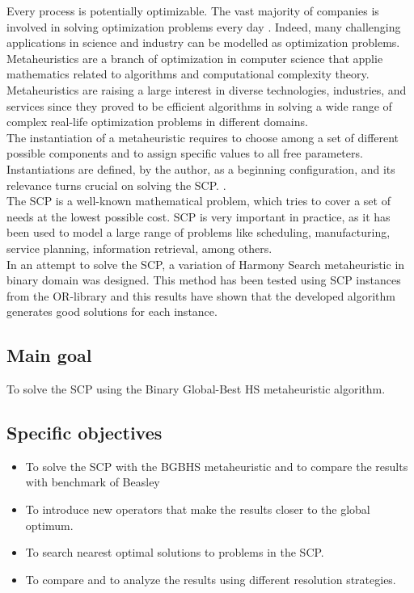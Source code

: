 Every process is potentially optimizable. The vast majority of companies is involved in solving optimization problems every day \cite{DBLP:books/daglib/0022645}. Indeed, many challenging applications in science and industry can be modelled as optimization problems.\\

Metaheuristics are a branch of optimization in computer science that applie mathematics related to algorithms and computational complexity theory. Metaheuristics are raising a large interest in diverse technologies, industries, and services since they proved to be efficient algorithms in solving a wide range of  complex real-life optimization problems in different domains.\\

The instantiation of a metaheuristic requires to choose among a set of different possible components and to assign specific values to all free parameters. Instantiations are defined, by the author, as a beginning configuration, and its relevance turns crucial on solving the SCP. \cite{DBLP:conf/gecco/BirattariSPV02}.\\

The SCP is a well-known mathematical problem, which tries to cover a set of needs at the lowest possible cost. SCP is very important in practice, as it has been used to model a large range of problems like scheduling, manufacturing, service planning, information retrieval, among others.\\

In an attempt to solve the SCP, a variation of Harmony Search metaheuristic in binary domain  was designed. This method has been tested using SCP instances from the OR-library \cite{citeulike:921349} and this results have shown that the developed algorithm generates good solutions for each instance.

\subsection{Main goal}
To solve the SCP using the Binary Global-Best HS metaheuristic algorithm. 

\subsection{Specific objectives}
\begin{itemize}
\item To solve the SCP with the BGBHS metaheuristic and to compare the results with benchmark of Beasley	
\item To introduce new operators that make the results closer to the global optimum.
\item To search nearest optimal solutions to problems in the SCP.
\item To compare and to analyze the results using different resolution strategies.
\end{itemize}


